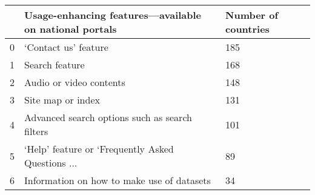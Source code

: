 \begin{tabular}{lll}
\toprule
{} & Usage-enhancing features—available on national portals & Number of countries \\
\midrule
0 &                               ‘Contact us’ feature &                 185 \\
1 &                                     Search feature &                 168 \\
2 &                            Audio or video contents &                 148 \\
3 &                                  Site map or index &                 131 \\
4 &     Advanced search options such as search filters &                 101 \\
5 &  ‘Help’ feature or ‘Frequently Asked Questions ... &                  89 \\
6 &         Information on how to make use of datasets &                  34 \\
\bottomrule
\end{tabular}
